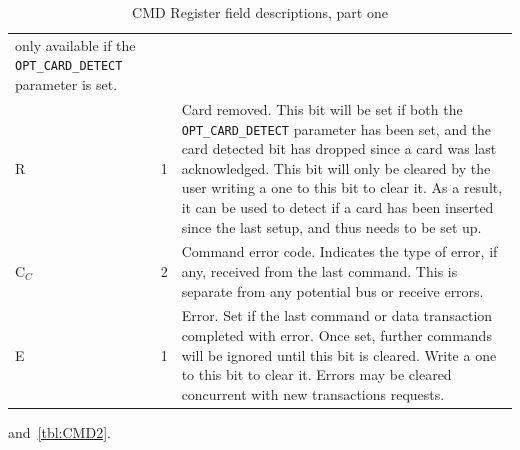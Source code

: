 \documentclass{gqtekspec}
\begin{document}
\begin{table}
\begin{center}
\begin{tabular}{|p{1.2in}|p{0.5in}|p{4.0in}|}
	only available if the {\tt OPT\_CARD\_DETECT} parameter is set.\\
R & 1 & Card removed.  This bit will be set if both the {\tt OPT\_CARD\_DETECT}
	parameter has been set, and the card detected bit has dropped since
	a card was last acknowledged.  This bit will only be cleared by the user
	writing a one to this bit to clear it.   As a result, it can be
	used to detect if a card has been inserted since the last setup, and
	thus needs to be set up. \\
C$_C$&2& Command error code.  Indicates the type of error, if any, received
	from the last command.  This is separate from any potential bus or
	receive errors. \\
E & 1 & Error.  Set if the last command or data transaction completed with
	error.  Once set, further commands will be ignored until this bit is
	cleared.  Write a one to this bit to clear it.  Errors may be cleared
	concurrent with new transactions requests. \\\hline
\end{tabular}
\caption{CMD Register field descriptions, part one}\label{tbl:CMD1}
\end{center}\end{table}
and~\ref{tbl:CMD2}.
\end{document}
